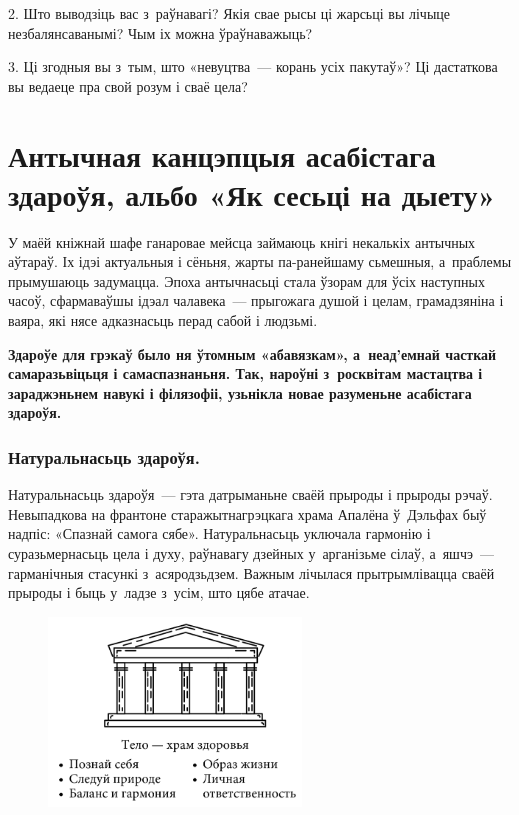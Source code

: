 2. Што выводзіць вас з~раўнавагі? Якія свае рысы ці жарсьці вы лічыце незбалянсаванымі? Чым іх можна ўраўнаважыць?

3. Ці згодныя вы з~тым, што «невуцтва~--- корань усіх пакутаў»? Ці дастаткова вы ведаеце пра свой розум і сваё цела?


\section[Антычная канцэпцыя асабістага здароўя, альбо «Як сесьці на дыету»][Антычная канцэпцыя асабістага здароўя]{Антычная канцэпцыя асабістага здароўя, альбо «Як сесьці на дыету»}


У маёй кніжнай шафе ганаровае мейсца займаюць кнігі некалькіх антычных аўтараў. Іх ідэі актуальныя і сёньня, жарты па-ранейшаму сьмешныя, а~праблемы прымушаюць задумацца. Эпоха антычнасьці стала ўзорам для ўсіх наступных часоў, сфармаваўшы ідэал чалавека~--- прыгожага душой і целам, грамадзяніна і ваяра, які нясе адказнасьць перад сабой і людзьмі. 

\textbf{Здароўе для грэкаў было ня ўтомным «абавязкам», а~неад'емнай часткай самаразьвіцьця і самаспазнаньня. Так, нароўні з~росквітам мастацтва і зараджэньнем навукі і філязофіі, узьнікла новае разуменьне асабістага здароўя.}

\subsubsection{Натуральнасьць здароўя.} 

Натуральнасьць здароўя~--- гэта датрыманьне сваёй прыроды і прыроды рэчаў. Невыпадкова на франтоне старажытнагрэцкага храма Апалёна ў~Дэльфах быў надпіс: «Спазнай самога сябе». Натуральнасьць уключала гармонію і суразьмернасьць цела і духу, раўнавагу дзейных у~арганізьме сілаў, а~яшчэ~--- гарманічныя стасункі з~асяродзьдзем. Важным лічылася прытрымлівацца сваёй прыроды і быць у~ладзе з~усім, што цябе атачае.

\begin{figure}[htb!]
  \centering
  \includegraphics[width=0.6\textwidth]{willpower/pic3.png}
\end{figure}

